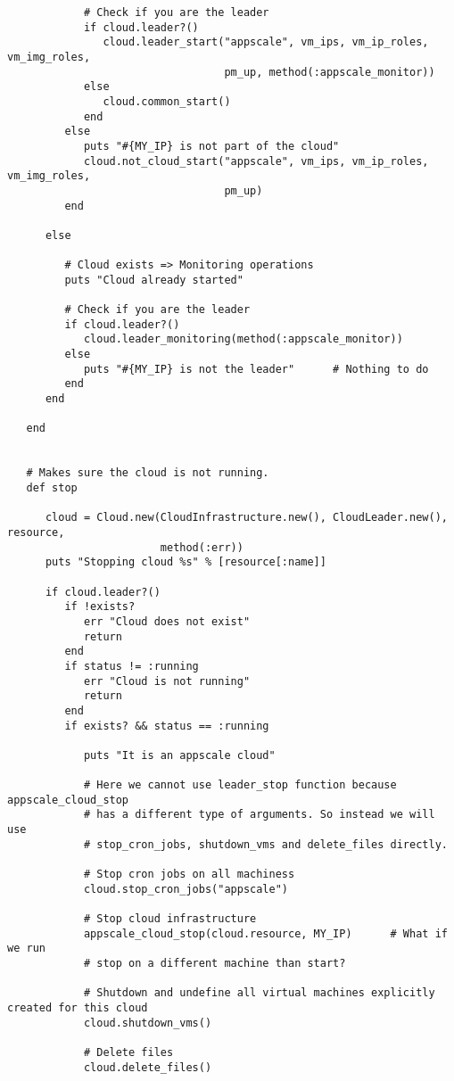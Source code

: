 \begin{lstlisting}
            # Check if you are the leader
            if cloud.leader?()
               cloud.leader_start("appscale", vm_ips, vm_ip_roles, vm_img_roles,
                                  pm_up, method(:appscale_monitor))
            else
               cloud.common_start()
            end
         else
            puts "#{MY_IP} is not part of the cloud"
            cloud.not_cloud_start("appscale", vm_ips, vm_ip_roles, vm_img_roles,
                                  pm_up)
         end
         
      else
         
         # Cloud exists => Monitoring operations
         puts "Cloud already started"
         
         # Check if you are the leader
         if cloud.leader?()
            cloud.leader_monitoring(method(:appscale_monitor))
         else
            puts "#{MY_IP} is not the leader"      # Nothing to do
         end
      end
      
   end


   # Makes sure the cloud is not running.
   def stop

      cloud = Cloud.new(CloudInfrastructure.new(), CloudLeader.new(), resource,
                        method(:err))
      puts "Stopping cloud %s" % [resource[:name]]

      if cloud.leader?()
         if !exists?
            err "Cloud does not exist"
            return
         end
         if status != :running
            err "Cloud is not running"
            return
         end
         if exists? && status == :running
            
            puts "It is an appscale cloud"
            
            # Here we cannot use leader_stop function because appscale_cloud_stop
            # has a different type of arguments. So instead we will use
            # stop_cron_jobs, shutdown_vms and delete_files directly.
            
            # Stop cron jobs on all machiness
            cloud.stop_cron_jobs("appscale")
            
            # Stop cloud infrastructure
            appscale_cloud_stop(cloud.resource, MY_IP)      # What if we run
            # stop on a different machine than start?

            # Shutdown and undefine all virtual machines explicitly created for this cloud
            cloud.shutdown_vms()
            
            # Delete files
            cloud.delete_files()
            

\end{lstlisting}
